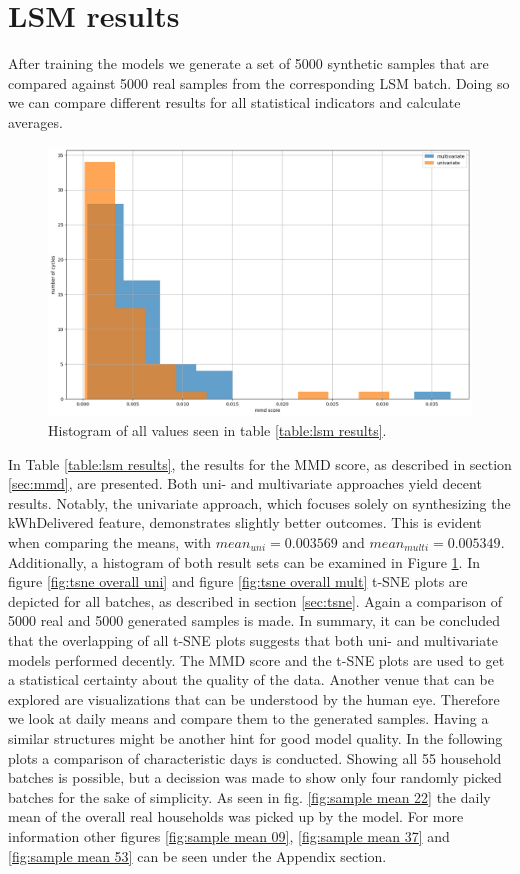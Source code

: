 \section{LSM results}
\label{subsec:LSM res}
After training the models we generate a set of 5000 synthetic samples that are compared against 5000 real samples from the corresponding LSM batch. 
Doing so we can compare different results for all statistical indicators and calculate averages.
\begin{figure}[!h]
    \centering
    \includegraphics[width=\textwidth]{images/lsm_res_histo.png}
    \caption{Histogram of all values seen in table \ref{table:lsm results}.}
    \label{fig:lsm res histo}
\end{figure}
In Table \ref{table:lsm results}, the results for the MMD score, as described in section \ref{sec:mmd}, are presented. Both uni- and multivariate approaches yield decent results. Notably, the univariate approach, which focuses solely on synthesizing the kWhDelivered feature, demonstrates slightly better outcomes. This is evident when comparing the means, with $mean_{uni} = 0.003569$ and $mean_{multi} = 0.005349$. Additionally, a histogram of both result sets can be examined in Figure \ref{fig:lsm res histo}.\newline
In figure \ref{fig:tsne overall uni} and figure \ref{fig:tsne overall mult} t-SNE plots are depicted for all batches, as described in section \ref{sec:tsne}. Again a comparison of 5000 real and 5000 generated samples is made.
In summary, it can be concluded that the overlapping of all t-SNE plots suggests that both uni- and multivariate models performed decently.\newline
The MMD score and the t-SNE plots are used to get a statistical certainty about the quality of the data. Another venue that can be explored are visualizations that can be understood by the human eye. Therefore we look at daily means and compare them to the generated samples. Having a similar structures might be another hint for good model quality. In the following plots a comparison of characteristic days is conducted. Showing all 55 household batches is possible, but a decission was made to show only four randomly picked batches for the sake of simplicity. As seen in fig. \ref{fig:sample mean 22} the daily mean of the overall real households was picked up by the model. For more information other figures \ref{fig:sample mean 09}, \ref{fig:sample mean 37} and  \ref{fig:sample mean 53} can be seen under the Appendix section.
